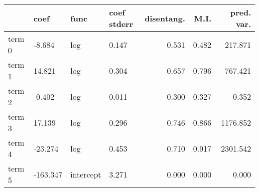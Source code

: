 \documentclass{article}%
\begin{document}
             \vfill \pagebreak%


\begin{table}[H]%
\centering%
\footnotesize%
\begin{tabular}{llllrrr}
\toprule
{} &      coef &       func & coef stderr &  disentang. &   M.I. &  pred. var. \\
\midrule
term 0 &    -8.684 &        log &       0.147 &       0.531 &  0.482 &     217.871 \\
term 1 &    14.821 &        log &       0.304 &       0.657 &  0.796 &     767.421 \\
term 2 &    -0.402 &        log &       0.011 &       0.300 &  0.327 &       0.352 \\
term 3 &    17.139 &        log &       0.296 &       0.746 &  0.866 &    1176.852 \\
term 4 &   -23.274 &        log &       0.453 &       0.710 &  0.917 &    2301.542 \\
term 5 &  -163.347 &  intercept &       3.271 &       0.000 &  0.000 &       0.000 \\
\bottomrule
\end{tabular}
%
\end{table}

%
\vfill \pagebreak

%
\end{document}
